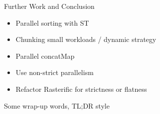 \documentclass[slidestop,compress,mathserif, xcolor=table]{beamer}
\begin{document}
\begin{frame}[c]{Further Work and Conclusion}

\begin{itemize}
\item Parallel sorting with ST
\item Chunking small workloads / dynamic strategy
\item Parallel concatMap
\item Use non-strict parallelism
\item Refactor Rasterific for strictness or flatness
\end{itemize}

\begin{center}
Some wrap-up words, TL;DR style
\end{center}

\end{frame}
\end{document}
